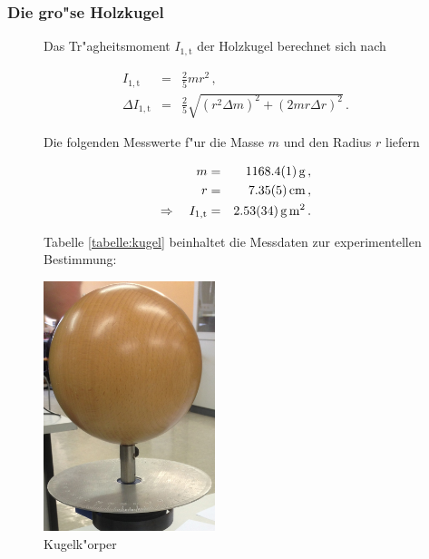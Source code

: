 			\clearpage
			\subsubsection{Die gro"se Holzkugel}
			\label{subsubsec:holzkugel}
				\begin{figure}[htbp]
					
					\begin{minipage}[t]{8cm}
						\vspace{0pt}
						Das Tr"agheitsmoment $I_\mathrm{1, t}$ der Holzkugel berechnet sich nach

						\begin{eqnarray*}
							I_\mathrm{1, t} & = & \frac{2}{5}mr^2 \,, \\
							\Delta I_\mathrm{1, t} & = & \frac{2}{5} \sqrt{ \left(r^2 \Delta m\right)^2 + \left( 2 mr \Delta r\right)^2} \,.
						\end{eqnarray*}

						Die folgenden Messwerte f"ur die Masse $m$ und den Radius $r$ liefern

						\begin{eqnarray*}
							m & = & \SI{1168.4 (1)}{\gram} \,, \\
							r & = & \SI{7.35 (5)}{\centi \meter} \,, \\
							\Rightarrow \quad I_\mathrm{1, t} & = & \SI{2.53 (34)}{\gram \meter \squared} \,.
						\end{eqnarray*}

						Tabelle \ref{tabelle:kugel} beinhaltet die Messdaten zur experimentellen Bestimmung:
					\end{minipage}
					\hfill
					\begin{minipage}[t]{5cm}
						\vspace{0pt}
						\centering
						\includegraphics[width = 5cm]{img/kugel.jpg}
						\caption{Kugelk"orper}
						\label{fig:kugel}
					\end{minipage}
				\end{figure}

